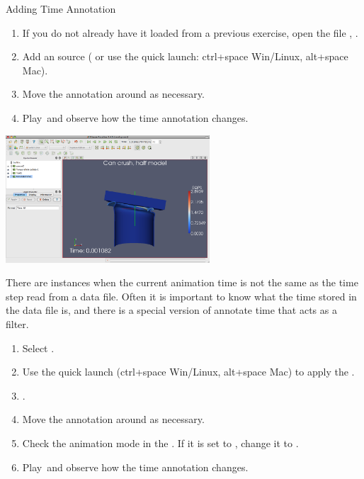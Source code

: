 \begin{exercise}{Adding Time Annotation}
  \label{ex:AddingTimeAnnotation}%
  \begin{enumerate}
  \item If you do not already have it loaded from a previous exercise, open
    the file , \apply.
  \item Add an  source ( \ra {} or use the quick launch: ctrl+space Win/Linux, alt+space Mac).
  \item Move the annotation around as necessary.
  \item Play~\vcrPlay and observe how the time annotation changes.
    \savecounter
  \end{enumerate}

  \begin{inlinefig}
    \includegraphics[width=3in]{images/AnnotateTimeSource}
  \end{inlinefig}

  There are instances when the current animation time is not the same as
  the time step read from a data file.  Often it is important to know what
  the time stored in the data file is, and there is a special version of
  annotate time that acts as a filter.

  \begin{enumerate}
    \restorecounter
  \item Select .
  \item Use the quick launch (ctrl+space Win/Linux, alt+space Mac) to apply
    the . 
  \item \apply.
  \item Move the annotation around as necessary.
  \item Check the animation mode in the .  If it is set
    to , change it to .
  \item Play~\vcrPlay and observe how the time annotation changes.
  \end{enumerate}


\end{exercise}
